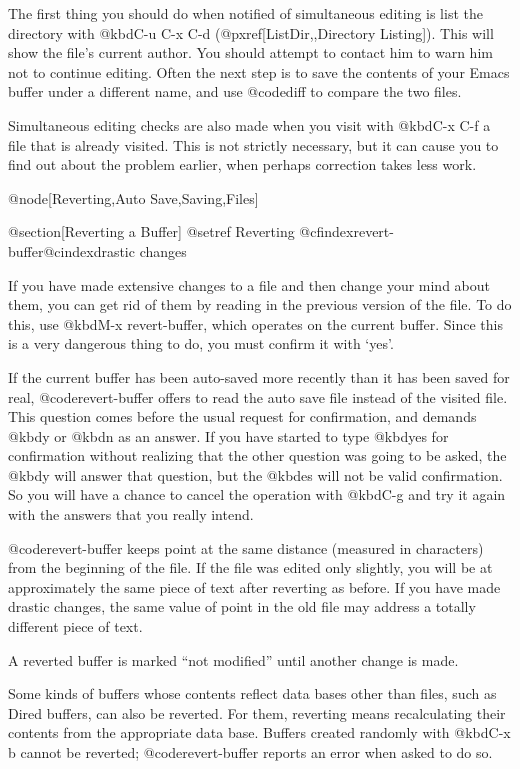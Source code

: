 {{{{{{{{{{{{{{{{{{  The first thing you should do when notified of simultaneous editing is
list the directory with @kbd{C-u C-x C-d} (@pxref[ListDir,,Directory Listing]).
This will show the file's current author.  You should attempt to contact
him to warn him not to continue editing.  Often the next step is to save
the contents of your Emacs buffer under a different name, and use
@code{diff} to compare the two files.

  Simultaneous editing checks are also made when you visit with @kbd{C-x
C-f} a file that is already visited.  This is not strictly necessary, but
it can cause you to find out about the problem earlier, when perhaps
correction takes less work.

@node[Reverting,Auto Save,Saving,Files]

@section[Reverting a Buffer]
@setref Reverting
@cfindex{revert-buffer}@cindex{drastic changes}

  If you have made extensive changes to a file and then change your mind
about them, you can get rid of them by reading in the previous version of
the file.  To do this, use @kbd{M-x revert-buffer}, which operates on the
current buffer.  Since this is a very dangerous thing to do, you must
confirm it with `yes'.

  If the current buffer has been auto-saved more recently than it has been
saved for real, @code{revert-buffer} offers to read the auto save file
instead of the visited file.  This question comes before the usual request
for confirmation, and demands @kbd{y} or @kbd{n} as an answer.  If you have
started to type @kbd{yes} for confirmation without realizing that the other
question was going to be asked, the @kbd{y} will answer that question, but
the @kbd{es} will not be valid confirmation.  So you will have a chance to
cancel the operation with @kbd{C-g} and try it again with the answers that
you really intend.

  @code{revert-buffer} keeps point at the same distance (measured in
characters) from the beginning of the file.  If the file was edited only
slightly, you will be at approximately the same piece of text after
reverting as before.  If you have made drastic changes, the same value of
point in the old file may address a totally different piece of text.

  A reverted buffer is marked ``not modified'' until another change is made.

  Some kinds of buffers whose contents reflect data bases other than files,
such as Dired buffers, can also be reverted.  For them, reverting means
recalculating their contents from the appropriate data base.  Buffers
created randomly with @kbd{C-x b} cannot be reverted; @code{revert-buffer}
reports an error when asked to do so.

}}}}}}}}}}}}}}}}}}
